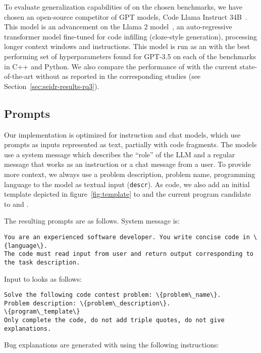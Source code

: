 To evaluate generalization capabilities of \method{} on the chosen benchmarks, we have chosen an open-source competitor of GPT models, Code Llama Instruct 34B~\cite{roziereCodeLlamaOpen2023}. 
This model is an advancement on the Llama 2 model~\cite{touvron2023:llama}, an auto-regressive transformer model fine-tuned for code infilling (cloze-style generation), processing longer context windows and instructions.
This model is run as an with the best performing set of hyperparameters found for GPT-3.5 on each of the benchmarks in C++ and Python.
We also compare the performance of \method{} with the current state-of-the-art without \method{} as reported in the corresponding studies (see Section~\ref{sec:seidr-results-rq3}).

\newpage \subsection{Prompts}
\label{sec:prompts}

Our implementation is optimized for instruction and chat models, which use prompts as inputs represented as text, partially with code fragments.
The models use a system message which describes the ``role'' of the LLM and a regular message that works as an instruction or a chat message from a user.
To provide more context, we always use a problem description, problem name, programming language to the model as textual input (\texttt{descr}). 
As code, we also add an initial template depicted in figure~\ref{fig:template} to \synthmodel{} and the current program candidate to \textmodel{} and \debugmodel{}.

The resulting prompts are as follows.
System message is: 

\begin{lstlisting}
You are an experienced software developer. You write concise code in \{language\}.
The code must read input from user and return output corresponding to the task description.
\end{lstlisting}

Input to \synthmodel{} looks as follows:

\begin{lstlisting}
Solve the following code contest problem: \{problem\_name\}. 
Problem description: \{problem\_description\}.
\{program\_template\}
Only complete the code, do not add triple quotes, do not give explanations.
\end{lstlisting}

Bug explanations are generated with \textmodel{} using the following instructions:

